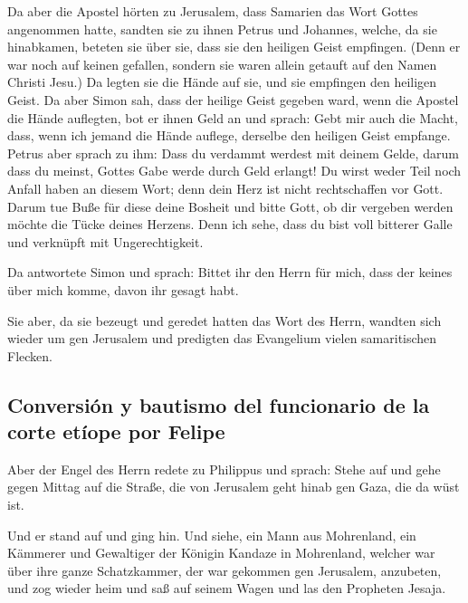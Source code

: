  Da aber die Apostel hörten zu Jerusalem, dass Samarien
das Wort Gottes angenommen hatte, sandten sie zu ihnen Petrus und
Johannes,  welche, da sie hinabkamen, beteten sie über
sie, dass sie den heiligen Geist empfingen.  (Denn er war
noch auf keinen gefallen, sondern sie waren allein getauft auf den Namen
Christi Jesu.)  Da legten sie die Hände auf sie, und sie
empfingen den heiligen Geist.  Da aber Simon sah, dass
der heilige Geist gegeben ward, wenn die Apostel die Hände auflegten,
bot er ihnen Geld an  und sprach: Gebt mir auch die
Macht, dass, wenn ich jemand die Hände auflege, derselbe den heiligen
Geist empfange.  Petrus aber sprach zu ihm: Dass du
verdammt werdest mit deinem Gelde, darum dass du meinst, Gottes Gabe
werde durch Geld erlangt!  Du wirst weder Teil noch
Anfall haben an diesem Wort; denn dein Herz ist nicht rechtschaffen vor
Gott.  Darum tue Buße für diese deine Bosheit und bitte
Gott, ob dir vergeben werden möchte die Tücke deines Herzens.
 Denn ich sehe, dass du bist voll bitterer Galle und
verknüpft mit Ungerechtigkeit.

 Da antwortete Simon und sprach: Bittet ihr den Herrn für
mich, dass der keines über mich komme, davon ihr gesagt habt.

 Sie aber, da sie bezeugt und geredet hatten das Wort des
Herrn, wandten sich wieder um gen Jerusalem und predigten das Evangelium
vielen samaritischen Flecken.

\hypertarget{conversiuxf3n-y-bautismo-del-funcionario-de-la-corte-etuxedope-por-felipe}{%
\subsection{Conversión y bautismo del funcionario de la corte etíope por
Felipe}\label{conversiuxf3n-y-bautismo-del-funcionario-de-la-corte-etuxedope-por-felipe}}

 Aber der Engel des Herrn redete zu Philippus und sprach:
Stehe auf und gehe gegen Mittag auf die Straße, die von Jerusalem geht
hinab gen Gaza, die da wüst ist.

 Und er stand auf und ging hin. Und siehe, ein Mann aus
Mohrenland, ein Kämmerer und Gewaltiger der Königin Kandaze in
Mohrenland, welcher war über ihre ganze Schatzkammer, der war gekommen
gen Jerusalem, anzubeten,  und zog wieder heim und saß
auf seinem Wagen und las den Propheten Jesaja.

